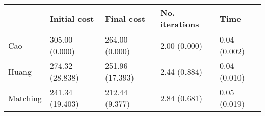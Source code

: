 \begin{tabular}{lllll}
\toprule
{} &     Initial cost &       Final cost & No. iterations &          Time \\
\midrule
Cao      &   305.00 (0.000) &   264.00 (0.000) &   2.00 (0.000) &  0.04 (0.002) \\
Huang    &  274.32 (28.838) &  251.96 (17.393) &   2.44 (0.884) &  0.04 (0.010) \\
Matching &  241.34 (19.403) &   212.44 (9.377) &   2.84 (0.681) &  0.05 (0.019) \\
\bottomrule
\end{tabular}
